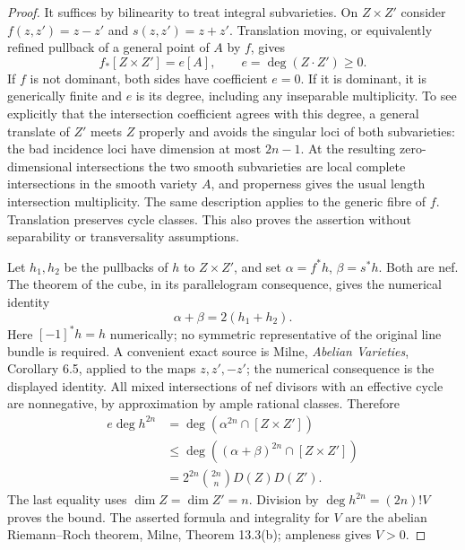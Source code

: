 \begin{proof}
It suffices by bilinearity to treat integral subvarieties.  On
$Z\times Z'$ consider $f(z,z')=z-z'$ and $s(z,z')=z+z'$.  Translation
moving, or equivalently refined pullback of a general point of $A$ by
$f$, gives
\[
 f_*[Z\times Z']=e[A],\qquad e=\deg(Z\cdot Z')\geq0.
\]
If $f$ is not dominant, both sides have coefficient $e=0$.  If it is
dominant, it is generically finite and $e$ is its degree, including any
inseparable multiplicity.  To see explicitly that the intersection
coefficient agrees with this degree, a general translate of $Z'$ meets
$Z$ properly and avoids the singular loci of both subvarieties: the
bad incidence loci have dimension at most $2n-1$.  At the resulting
zero-dimensional intersections the two smooth subvarieties are local
complete intersections in the smooth variety $A$, and properness gives
the usual length intersection multiplicity.  The same description
applies to the generic fibre of $f$.  Translation preserves cycle
classes.  This also proves the assertion without separability or
transversality assumptions.

Let $h_1,h_2$ be the pullbacks of $h$ to $Z\times Z'$, and set
$\alpha=f^*h$, $\beta=s^*h$.  Both are nef.  The theorem of the cube,
in its parallelogram consequence, gives the numerical identity
\[
 \alpha+\beta=2(h_1+h_2).
\]
Here $[-1]^*h=h$ numerically; no symmetric representative of the
original line bundle is required.  A convenient exact source is
Milne, \emph{Abelian Varieties}, Corollary 6.5, applied to the maps
$z,z',-z'$; the numerical consequence is the displayed identity.
All mixed intersections of nef divisors with an effective cycle are
nonnegative, by approximation by ample rational classes.  Therefore
\begin{align*}
 e\deg h^{2n}
 &=\deg(\alpha^{2n}\cap[Z\times Z'])\\
 &\leq\deg((\alpha+\beta)^{2n}\cap[Z\times Z'])\\
 &=2^{2n}\binom{2n}{n}D(Z)D(Z').
\end{align*}
The last equality uses $\dim Z=\dim Z'=n$.  Division by
$\deg h^{2n}=(2n)!V$ proves the bound.  The asserted formula and
integrality for $V$ are the abelian Riemann--Roch theorem, Milne,
Theorem 13.3(b); ampleness gives $V>0$.
\end{proof}

